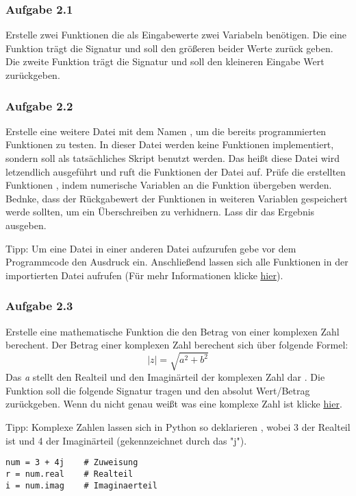 \subsubsection{Aufgabe 2.1}
Erstelle zwei Funktionen die als Eingabewerte zwei Variabeln benötigen. Die eine Funktion trägt die Signatur  und soll den größeren beider Werte zurück geben. Die zweite Funktion trägt die Signatur  und soll den kleineren Eingabe Wert zurückgeben.
\subsubsection{Aufgabe 2.2}
Erstelle eine weitere Datei mit dem Namen , um die bereits programmierten Funktionen zu testen. In dieser Datei werden keine Funktionen implementiert, sondern soll als tatsächliches Skript benutzt werden. Das heißt diese Datei wird letzendlich ausgeführt und ruft die Funktionen der  Datei auf. Prüfe die erstellten Funktionen , indem numerische Variablen an die Funktion übergeben werden. Bednke, dass der Rückgabewert der Funktionen in weiteren Variablen gespeichert werde sollten, um ein Überschreiben zu verhidnern. Lass dir das Ergebnis ausgeben.

Tipp: Um eine Datei in einer anderen Datei aufzurufen gebe vor dem Programmcode den Ausdruck  ein. Anschließend lassen sich alle Funktionen in der importierten Datei aufrufen (Für mehr Informationen klicke \underline{\href{https://stackoverflow.com/questions/2349991/how-to-import-other-python-files}{hier}}).

\subsubsection{Aufgabe 2.3}
Erstelle eine mathematische Funktion die den Betrag von einer komplexen Zahl berechent. Der Betrag einer komplexen Zahl berechent sich über folgende Formel:
\begin{equation}
|z| = \sqrt{a^2 + b^2}
\end{equation}
Das \textit{a} stellt den Realteil und  den Imaginärteil der komplexen Zahl dar . Die Funktion soll die folgende Signatur tragen  und den absolut Wert/Betrag zurückgeben.
 Wenn du nicht genau weißt was eine komplexe Zahl ist klicke \underline{\href{https://de.wikipedia.org/wiki/Komplexe_Zahl}{hier}}. 

Tipp: Komplexe Zahlen lassen sich in Python so deklarieren , wobei 3 der Realteil ist und 4 der Imaginärteil (gekennzeichnet durch das "j"). 
\begin{lstlisting}
num = 3 + 4j 	# Zuweisung
r = num.real	# Realteil
i = num.imag	# Imaginaerteil
\end{lstlisting}

